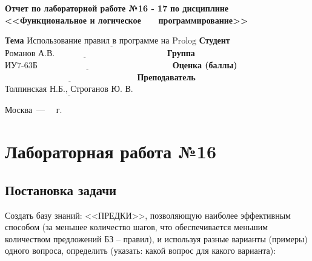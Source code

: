 \documentclass[12pt]{report}
\begin{document}
\begin{titlepage}
		\begin{center}
			\noindent\begin{minipage}{1.1\textwidth}\centering
				\Large\textbf{  Отчет по лабораторной работе №16 - 17}\newline
				\textbf{по дисциплине <<Функциональное и логическое}\newline
				\textbf{~~~программирование>>}\newline\newline
			\end{minipage}
		\end{center}
		
		\noindent\textbf{Тема} $\underline{\text{Использование правил в программе на Prolog}}$\newline\newline
		\noindent\textbf{Студент} $\underline{\text{Романов А.В.~~~~~~~~~~~~~~~~~~~~~~~~~~~~~~~~~~~~~~~}}$\newline\newline
		\noindent\textbf{Группа} $\underline{\text{ИУ7-63Б~~~~~~~~~~~~~~~~~~~~~~~~~~~~~~~~~~~~~~~~~~~~~~~}}$\newline\newline
		\noindent\textbf{Оценка (баллы)} $\underline{\text{~~~~~~~~~~~~~~~~~~~~~~~~~~~~~~~~~~~~~~~~~~~~~~}}$\newline\newline
		\noindent\textbf{Преподаватель} $\underline{\text{Толпинская Н.Б., Строганов Ю. В.}}$\newline\newline\newline
		
		\begin{center}
			\vfill
			Москва~---~\the\year
			~г.
		\end{center}
	\end{titlepage}
	

\chapter*{Лабораторная работа №16}
\section*{Постановка задачи}

Создать базу знаний: <<ПРЕДКИ>>, позволяющую наиболее эффективным способом (за меньшее количество шагов, что обеспечивается меньшим количеством предложений БЗ – правил), и используя разные варианты (примеры) одного вопроса, определить (указать: какой вопрос для какого варианта):
\end{document}
